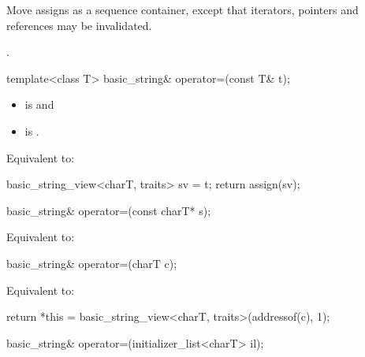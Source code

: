 \begin{itemdescr}
\pnum
\effects
Move assigns as a sequence container,
except that iterators, pointers and references may be invalidated.

\pnum
\returns
{}.
\end{itemdescr}

%
\begin{itemdecl}
template<class T>
  basic_string& operator=(const T& t);
\end{itemdecl}

\begin{itemdescr}
\pnum
\constraints
\begin{itemize}
\item {}
is  and
\item {}
is .
\end{itemize}

\pnum
\effects Equivalent to:
\begin{codeblock}
basic_string_view<charT, traits> sv = t;
return assign(sv);
\end{codeblock}
\end{itemdescr}

%
\begin{itemdecl}
basic_string& operator=(const charT* s);
\end{itemdecl}

\begin{itemdescr}
\pnum
\effects Equivalent to:
\end{itemdescr}

%
\begin{itemdecl}
basic_string& operator=(charT c);
\end{itemdecl}

\begin{itemdescr}
\pnum
\effects Equivalent to:
\begin{codeblock}
return *this = basic_string_view<charT, traits>(addressof(c), 1);
\end{codeblock}
\end{itemdescr}

%
\begin{itemdecl}
basic_string& operator=(initializer_list<charT> il);
\end{itemdecl}

